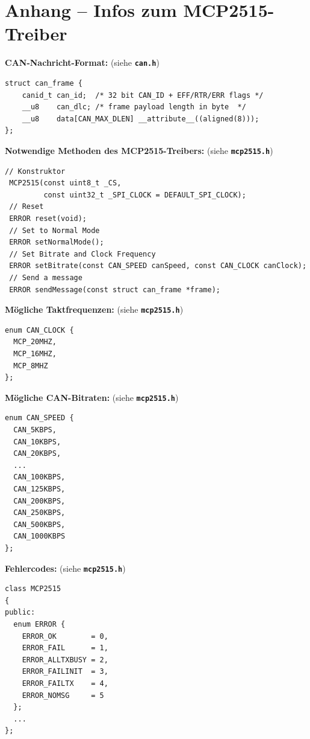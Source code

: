 \documentclass[
    fontsize=12pt,                      %
    paper=a4,                           %
    twoside=off,                       %
    DIV=15,                             %
    BCOR=12mm,                          %
    headings=normal,                    %
    headsepline=false,                   %
    footsepline=false,                  %
    headinclude=true,                   %
    footinclude=false,                  %
    toc=listof,                         %
    toc=bib,                            %
    chapterprefix=false,                %
    appendixprefix=false,               %
    numbers=noendperiod,                %
    captions=tableabove,                %
    footnotes=multiple,                 %
    bibliography=oldstyle,              %
    draft=false,                        %
]{scrreprt}
\newcommand{\Farbcode}[1]{\texttt{\textbf{\textcolor{myred}{#1}}}}
\begin{document}
\section*{Anhang -- Infos zum MCP2515-Treiber} 
\noindent
\textbf{CAN-Nachricht-Format:} (siehe  \Farbcode{can.h})
\begin{lstlisting}[frame=single,  label=LST_MyCam]
struct can_frame {
    canid_t can_id;  /* 32 bit CAN_ID + EFF/RTR/ERR flags */
    __u8    can_dlc; /* frame payload length in byte  */
    __u8    data[CAN_MAX_DLEN] __attribute__((aligned(8)));
};
\end{lstlisting}
\vskip 0.5cm
\noindent
\textbf{Notwendige Methoden des MCP2515-Treibers:} (siehe \Farbcode{mcp2515.h})
\begin{lstlisting}[frame=single,  label=LST_MyCam]
 // Konstruktor
 MCP2515(const uint8_t _CS, 
         const uint32_t _SPI_CLOCK = DEFAULT_SPI_CLOCK);
 // Reset
 ERROR reset(void);
 // Set to Normal Mode
 ERROR setNormalMode();
 // Set Bitrate and Clock Frequency
 ERROR setBitrate(const CAN_SPEED canSpeed, const CAN_CLOCK canClock);
 // Send a message
 ERROR sendMessage(const struct can_frame *frame);
\end{lstlisting}
\vskip 0.5cm
\noindent
\textbf{Mögliche Taktfrequenzen:} (siehe \Farbcode{mcp2515.h})
\begin{lstlisting}[frame=single,  label=LST_MyCam]
enum CAN_CLOCK {
  MCP_20MHZ,
  MCP_16MHZ,
  MCP_8MHZ
};
\end{lstlisting}
\vskip 0.5cm
\noindent
\textbf{Mögliche CAN-Bitraten:} (siehe \Farbcode{mcp2515.h})
\begin{lstlisting}[frame=single,  label=LST_MyCam]
enum CAN_SPEED {
  CAN_5KBPS,
  CAN_10KBPS,
  CAN_20KBPS,
  ...
  CAN_100KBPS,
  CAN_125KBPS,
  CAN_200KBPS,
  CAN_250KBPS,
  CAN_500KBPS,
  CAN_1000KBPS
};
\end{lstlisting}
\vskip 0.5cm
\noindent
\textbf{Fehlercodes:} (siehe \Farbcode{mcp2515.h})
\begin{lstlisting}[frame=single,  label=LST_MyCam]
class MCP2515
{
public:
  enum ERROR {
    ERROR_OK        = 0,
    ERROR_FAIL      = 1,
    ERROR_ALLTXBUSY = 2,
    ERROR_FAILINIT  = 3,
    ERROR_FAILTX    = 4,
    ERROR_NOMSG     = 5
  };
  ...
};  
\end{lstlisting}
\end{document}

